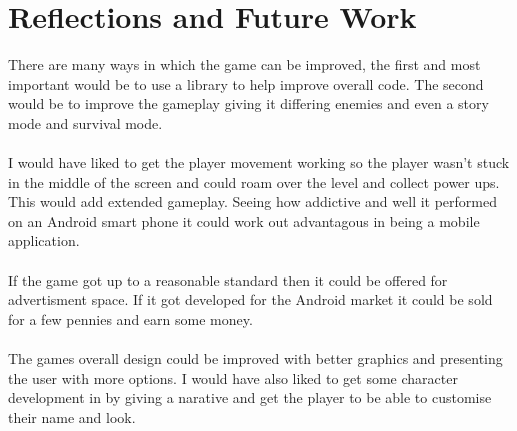 \documentclass{article}
\begin{document}
\section{Reflections and Future Work}
There are many ways in which the game can be improved, the first and most important would be to use a library to help improve overall code. The second would be to improve the gameplay giving it differing enemies and even a story mode and survival mode.
\\\\
I would have liked to get the player movement working so the player wasn't stuck in the middle of the screen and could roam over the level and collect power ups. This would add extended gameplay. Seeing how addictive and well it performed on an Android smart phone it could work out advantagous in being a mobile application.
\\\\
If the game got up to a reasonable standard then it could be offered for advertisment space. If it got developed for the Android market it could be sold for a few pennies and earn some money.
\\\\
The games overall design could be improved with better graphics and presenting the user with more options. I would have also liked to get some character development in by giving a narative and get the player to be able to customise their name and look.
\end{document}
